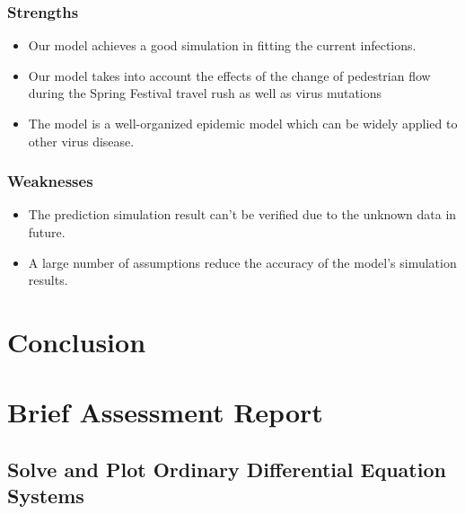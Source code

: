 \documentclass{mcmthesis}
\begin{document}
\subsubsection{Strengths}
\begin{itemize}
	\item Our model achieves a good simulation in fitting the current infections.
	\item Our model takes into account the effects of the change of pedestrian flow during the Spring Festival travel rush as well as virus mutations
	\item The model is a well-organized epidemic model which can be widely applied to other virus disease.
\end{itemize}
\subsubsection{Weaknesses}
\begin{itemize}
	\item The prediction simulation result can't be verified due to the unknown data in future.  
	\item A large number of assumptions reduce the accuracy of the model’s simulation results.
\end{itemize}


\section{Conclusion}\label{S8}


\newpage





\section*{Brief Assessment Report}\label{S9}

\newpage

\begin{appendices}

\section{Solve and Plot Ordinary Differential Equation Systems}


\end{appendices}


\newpage


\end{document}
